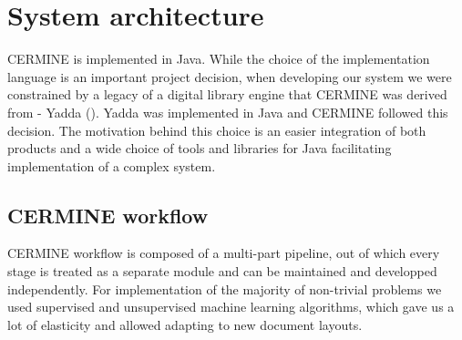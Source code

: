 \chapter{System architecture}
CERMINE is implemented in Java. While the choice of the implementation language is an important project decision, when developing our system we were constrained by a legacy of a digital library engine that CERMINE was derived from - Yadda (\cite{Yadda}). Yadda was implemented in Java and CERMINE followed this decision. The motivation behind this choice is an easier integration of both products and a wide choice of tools and libraries for Java facilitating implementation of a complex system.

\section{CERMINE workflow}
CERMINE workflow is composed of a multi-part pipeline, out of which every stage is treated as a separate module and can be maintained and developped independently. For implementation of the majority of non-trivial problems we used supervised and unsupervised machine learning algorithms, which gave us a lot of elasticity and allowed adapting to new document layouts.


